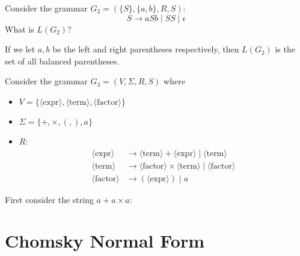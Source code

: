 \begin{exercise}
    Consider the grammar $G_2 = (\{S\}, \{a, b\}, R, S)$:
    \[
        S \to aSb \mid SS \mid \epsilon
    \]
    What is $L(G_2)$?
\end{exercise}
\begin{answer}
If we let $a, b$ be the left and right parentheses respectively, then $L(G_2)$ is the set of all balanced parentheses.
\end{answer}

\begin{eg}
    Consider the grammar $G_3 = (V, \Sigma, R, S)$
    where
    \begin{itemize}
        \item $V = \{\langle \text{expr} \rangle, \langle \text{term} \rangle, \langle \text{factor} \rangle\}$
        \item $\Sigma = \{ +, \times, (, ), a \}$
        \item $R$: 
        \begin{align*}
            \langle \text{expr} \rangle &\to \langle \text{term} \rangle + \langle \text{expr} \rangle \mid \langle \text{term} \rangle \\
            \langle \text{term} \rangle &\to \langle \text{factor} \rangle \times \langle \text{term} \rangle \mid \langle \text{factor} \rangle \\
            \langle \text{factor} \rangle &\to ( \langle \text{expr} \rangle ) \mid a
        \end{align*}
    \end{itemize}
\end{eg}

First consider the string $a + a \times a$:




\newpage



\section{Chomsky Normal Form}

\newpage